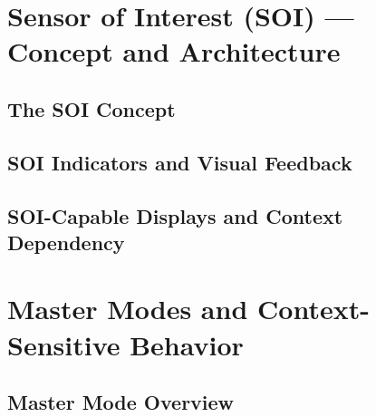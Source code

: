 \documentclass[11pt, a4paper, twoside]{report}
\begin{document}
\section{Sensor of Interest (SOI) — Concept and Architecture}

\subsection{The SOI Concept}

\subsection{SOI Indicators and Visual Feedback}

\subsection{SOI-Capable Displays and Context Dependency}

\section{Master Modes and Context-Sensitive Behavior}

\subsection{Master Mode Overview}

\end{document}
